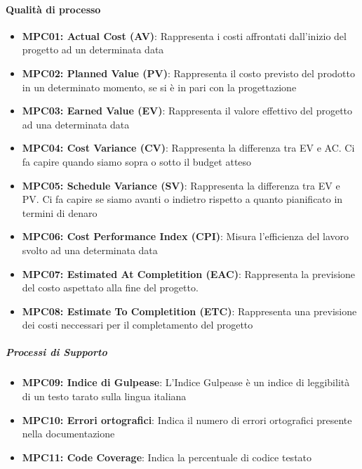 \documentclass[12pt]{article}
\begin{document}
\paragraph{Qualità di processo}
\begin{itemize}
    \item \textbf{MPC01: Actual Cost (AV)}: Rappresenta i costi affrontati dall'inizio del progetto ad un determinata data

    \item \textbf{MPC02: Planned Value (PV)}:  Rappresenta il costo previsto del prodotto in un determinato momento, se si è in pari con la progettazione

    \item \textbf{MPC03: Earned Value (EV)}:  Rappresenta il valore effettivo del progetto ad una determinata data

    \item \textbf{MPC04: Cost Variance (CV)}:  Rappresenta la differenza tra EV e AC. Ci fa capire quando siamo sopra o sotto il budget atteso

    \item \textbf{MPC05: Schedule Variance (SV)}:  Rappresenta la differenza tra EV e PV. Ci fa capire se siamo avanti o indietro rispetto a quanto pianificato in termini di denaro

    \item \textbf{MPC06: Cost Performance Index (CPI)}: Misura l'efficienza del lavoro svolto ad una determinata data

    \item \textbf{MPC07: Estimated At Completition (EAC)}: Rappresenta la previsione del costo aspettato alla fine del progetto.

    \item \textbf{MPC08: Estimate To Completition (ETC)}: Rappresenta una previsione dei costi neccessari per il completamento del progetto
\end{itemize}

\subparagraph{Processi di Supporto}

\begin{itemize}
    \item \textbf{MPC09: Indice di Gulpease}: L'Indice Gulpease è un indice di leggibilità di un testo tarato sulla lingua italiana

    \item \textbf{MPC10: Errori ortografici}: Indica il numero di errori ortografici presente nella documentazione

    \item \textbf{MPC11: Code Coverage}: Indica la percentuale di codice testato

\end{itemize}
\end{document}
